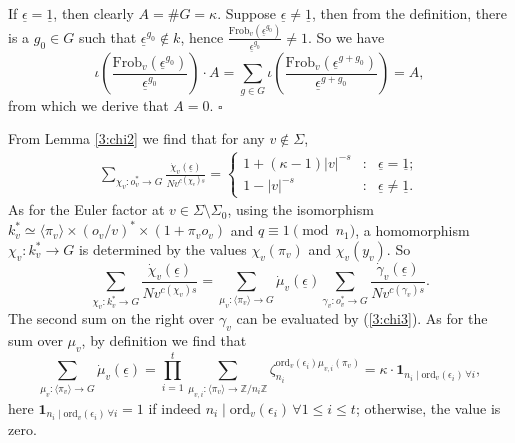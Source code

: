 \documentclass[12pt]{amsart}
\theoremstyle{plain}
\begin{document}
If ${\underline{{\epsilon}}}={\underline{{1}}}$, then clearly $A=\#G=\kappa$. Suppose ${\underline{{\epsilon}}} \ne {\underline{{1}}}$, then from the definition, there is a $g_0 \in G$ such that ${\underline{{\epsilon}}}^{g_0} \notin k$, hence $\frac{{\mathrm{Frob}}_v\left({\underline{{\epsilon}}}^{g_0}\right)}{{\underline{{\epsilon}}}^{g_0}} \ne 1$. So we have
\[\iota\left(\frac{{\mathrm{Frob}}_v\left({\underline{{\epsilon}}}^{g_0}\right)}{{\underline{{\epsilon}}}^{g_0}}\right) \cdot A=
\sum_{g \in G}\iota\left(\frac{{\mathrm{Frob}}_v\left({\underline{{\epsilon}}}^{g+g_0}\right)}{{\underline{{\epsilon}}}^{g+g_0}}\right)=A,\]
from which we derive that $A=0$. \quad $\square$

From Lemma \ref{3:chi2} we find that for any $ v \notin \Sigma$,
\begin{eqnarray} \label{3:chi3} \sum_{\chi_v: o_v^* \to G} \frac{\dot{\chi}_v({\underline{{\epsilon}}})}{Nv^{c(\chi_v)s}}=
 \left\{\begin{array}{lcc}
1+(\kappa-1)|v|^{-s}&:& {\underline{{\epsilon}}}={\underline{{1}}}; \\
1-|v|^{-s}&:& {\underline{{\epsilon}}} \ne {\underline{{1}}}. \end{array}\right.\end{eqnarray}
As for the Euler factor at $v \in \Sigma \setminus \Sigma_0$, using the isomorphism $k_v^* \simeq \langle \pi_v \rangle \times (o_v/v)^* \times \left(1+\pi_v o_v\right)$ and $q \equiv 1 \pmod{n_1}$, a homomorphism $\chi_v:k_v^* \to G$ is determined by the values $\chi_v(\pi_v)$ and $\chi_v(y_v)$. So
\[\sum_{\chi_v: k_v^* \to G} \frac{\dot{\chi}_v({\underline{{\epsilon}}})}{Nv^{c(\chi_v)s}}=\sum_{\mu_v: \langle \pi_v \rangle \to G} \dot{\mu}_v({\underline{{\epsilon}}})
\sum_{\gamma_v: o_v^* \to G} \frac{\dot{\gamma}_v({\underline{{\epsilon}}})}{Nv^{c(\gamma_v)s}}. \]
The second sum on the right over $\gamma_v$ can be evaluated by (\ref{3:chi3}). As for the sum over $\mu_v$, by definition we find that
\[\sum_{\mu_v: \langle \pi_v \rangle \to G} \dot{\mu}_v({\underline{{\epsilon}}}) = \prod_{i=1}^t \sum_{\mu_{v,i}: \langle \pi_v \rangle \to {{\mathbb Z}}/n_i{{\mathbb Z}}} \zeta_{n_i}^{\mathrm{ord}_v(\epsilon_i) \mu_{v,i}(\pi_v)}=\kappa \cdot \mathbf{1}_{n_i \mid \mathrm{ord}_v(\epsilon_i) \, \forall i}, \]
here $\mathbf{1}_{n_i \mid \mathrm{ord}_v(\epsilon_i) \, \forall i}=1$ if indeed $n_i \mid \mathrm{ord}_v(\epsilon_i) \, \forall 1 \le i \le t$; otherwise, the value is zero.
\end{document}
